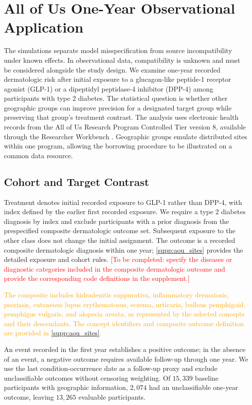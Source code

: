 \documentclass[12pt]{article}
\begin{document}
\section{All of Us One-Year Observational Application}\label{sec:realdata}
The simulations separate model misspecification from source incompatibility under known effects. In observational data, compatibility is unknown and must be considered alongside the study design. We examine one-year recorded dermatologic risk after initial exposure to a glucagon-like peptide-1 receptor agonist (GLP-1) or a dipeptidyl peptidase-4 inhibitor (DPP-4) among participants with type 2 diabetes. The statistical question is whether other geographic groups can improve precision for a designated target group while preserving that group's treatment contrast. The analysis uses electronic health records from the All of Us Research Program Controlled Tier version 8, available through the Researcher Workbench \citep{allofus2019,allofus2026cdr8}. Geographic groups emulate distributed sites within one program, allowing the borrowing procedure to be illustrated on a common data resource.

\subsection{Cohort and Target Contrast}
Treatment denotes initial recorded exposure to GLP-1 rather than DPP-4, with index defined by the earlier first recorded exposure. We require a type 2 diabetes diagnosis by index and exclude participants with a prior diagnosis from the prespecified composite dermatologic outcome set. Subsequent exposure to the other class does not change the initial assignment. The outcome is a recorded composite dermatologic diagnosis within one year; \cref{supp:aou_sites} provides the detailed exposure and cohort rules. \textcolor{red}{[To be completed: specify the diseases or diagnostic categories included in the composite dermatologic outcome and provide the corresponding code definitions in the supplement.]}

\textcolor{orange}{The composite includes hidradenitis suppurativa, inflammatory dermatosis, psoriasis, cutaneous lupus erythematosus, eczema, urticaria, bullous pemphigoid, pemphigus vulgaris, and alopecia areata, as represented by the selected concepts and their descendants. The concept identifiers and composite outcome definition are provided in \cref{supp:aou_sites}.}

An event recorded in the first year establishes a positive outcome; in the absence of an event, a negative outcome requires available follow-up through one year. We use the last condition-occurrence date as a follow-up proxy and exclude unclassifiable outcomes without censoring weighting. Of $15{,}339$ baseline participants with geographic information, $2{,}074$ had an unclassifiable one-year outcome, leaving $13{,}265$ evaluable participants.
\end{document}
